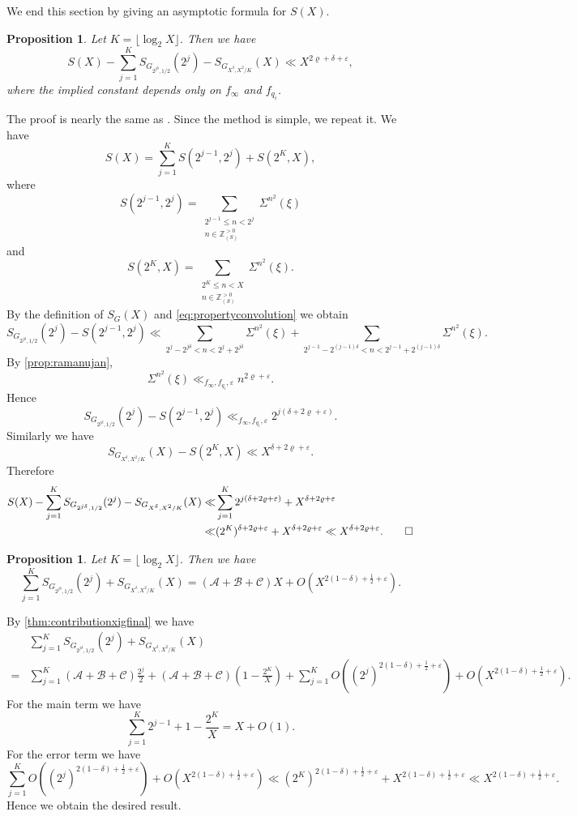 \documentclass[10pt,oneside,reqno]{amsart}
\makeatletter
\newcommand\ZZ{\mathbb{Z}}
\newcommand\ms[1]{\mathscr{#1}}
\renewcommand\leq{\leqslant}
\theoremstyle{THEOREM}
\newtheorem{proposition}[theorem]{Proposition}
\theoremstyle{DEFINITION}
\theoremstyle{EXERCISE}
\numberwithin{equation}{section}
\renewenvironment{proof}[1][\proofname]{\par
  \vspace{-6pt}
  \pushQED{\qed}
  \normalfont \topsep6\p@\@plus6\p@\relax
  \trivlist
  \item[\hskip\labelsep\rmfamily\bfseries
    #1\@addpunct{:}]\ignorespaces
}{
  \popQED\endtrivlist\@endpefalse
  \vspace{-6pt}
}
\makeatother
\begin{document}
We end this section by giving an asymptotic formula for $S(X)$.
\begin{proposition}
Let $K=\lfloor \log_2 X\rfloor$. Then we have
\[
S(X)-\sum_{j=1}^{K}S_{G_{2^{j\delta},1/2}}(2^j)-S_{G_{X^{\delta},X^2/K}}(X)\ll X^{2\varrho+\delta+\varepsilon},
\]
where the implied constant depends only on $f_\infty$ and $f_{q_i}$.
\end{proposition}
\begin{proof}
The proof is nearly the same as \cite[Proposition 7.15]{cheng2025c}. Since the method is simple, we repeat it.
We have
\[
S(X)=\sum_{j=1}^{K}S(2^{j-1},2^j)+S(2^K,X),
\]
where
\[
S(2^{j-1},2^j)=\sum_{\substack{2^{j-1}\leq n<2^j\\n\in \ZZ_{(S)}^{>0}}}\Sigma^{n^2}(\xi)
\]
and
\[
S(2^K,X)=\sum_{\substack{2^K\leq n<X\\n\in \ZZ_{(S)}^{>0}}}\Sigma^{n^2}(\xi).
\]
By the definition of $S_G(X)$ and \eqref{eq:propertyconvolution} we obtain
\[
S_{G_{2^{j\delta},1/2}}(2^j)-S(2^{j-1},2^j)\ll \sum_{2^j-2^{j\delta}<n<2^j+2^{j\delta}}\Sigma^{n^2}(\xi)+ \sum_{2^{j-1}-2^{(j-1)\delta}<n<2^{j-1}+2^{(j-1)\delta}} \Sigma^{n^2}(\xi).
\]
By \autoref{prop:ramanujan},
\[
\Sigma^{n^2}(\xi)\ll_{f_\infty,f_{q_i},\varepsilon} n^{2\varrho+\varepsilon}.
\]
Hence
\[
S_{G_{2^{j\delta},1/2}}(2^j)-S(2^{j-1},2^j)\ll_{f_\infty,f_{q_i},\varepsilon} 2^{j(\delta+2\varrho+\varepsilon)}.
\]
Similarly we have
\[
S_{G_{X^{\delta},X^2/K}}(X)-S(2^K,X)\ll X^{\delta+2\varrho+\varepsilon}.
\]
Therefore
\begin{align*}
S(X)-\sum_{j=1}^{K}S_{G_{2^{j\delta},1/2}}(2^j)-S_{G_{X^{\delta},X^2/K}}(X)\ll& \sum_{j=1}^{K}2^{j(\delta+2\varrho+\varepsilon)}+X^{\delta+2\varrho+\varepsilon}\\
\ll& (2^K)^{\delta+2\varrho+\varepsilon}+X^{\delta+2\varrho+\varepsilon}\ll X^{\delta+2\varrho+\varepsilon}. \qedhere
\end{align*}
\end{proof}

\begin{proposition}
Let $K=\lfloor \log_2 X\rfloor$. Then we have
\[
\sum_{j=1}^{K}S_{G_{2^{j\delta},1/2}}(2^j) +S_{G_{X^{\delta},X^2/K}}(X)
=(\ms{A}+\ms{B}+\ms{C})X+ O(X^{2(1-\delta)+\frac12+\varepsilon}).
\]
\end{proposition}
\begin{proof}
By \autoref{thm:contributionxigfinal} we have
\begin{align*}
&\sum_{j=1}^{K}S_{G_{2^{j\delta},1/2}}(2^j) +S_{G_{X^{\delta},X^2/K}}(X)\\
=&\sum_{j=1}^{K}(\ms{A}+\ms{B}+\ms{C})\frac{2^j}{2}+(\ms{A}+\ms{B}+\ms{C})\left(1-\frac{2^K}{X}\right)
+\sum_{j=1}^{K}O((2^j)^{2(1-\delta)+\frac12+\varepsilon})+O(X^{2(1-\delta)+\frac12+\varepsilon}).
\end{align*}
For the main term we have
\[
\sum_{j=1}^{K}2^{j-1}+1-\frac{2^K}{X}=X+O(1).
\]
For the error term we have
\[
\sum_{j=1}^{K}O((2^j)^{2(1-\delta)+\frac12+\varepsilon})+O(X^{2(1-\delta)+\frac12+\varepsilon})\ll (2^K)^{2(1-\delta)+\frac12+\varepsilon}+X^{2(1-\delta)+\frac12+\varepsilon}\ll X^{2(1-\delta)+\frac12+\varepsilon}.
\]
Hence we obtain the desired result.
\end{proof}
\end{document}
